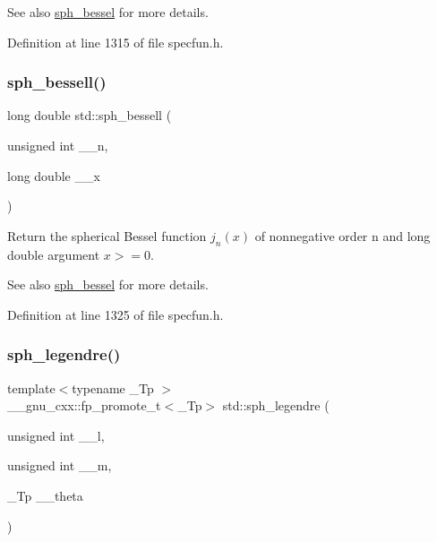\begin{DoxySeeAlso}{See also}
\hyperlink{group__cxx17__math__spec__func_gad125841d7c85e461cb8954952e3a17c8}{sph\+\_\+bessel} for more details. 
\end{DoxySeeAlso}


Definition at line 1315 of file specfun.\+h.

\mbox{\label{group__cxx17__math__spec__func_ga11d72b1af81ce9da3c878a25087ee927}} 
\subsubsection{\texorpdfstring{sph\+\_\+bessell()}{sph\_bessell()}}
{\footnotesize\ttfamily long double std\+::sph\+\_\+bessell (\begin{DoxyParamCaption}\item[{unsigned int}]{\+\_\+\+\_\+n,  }\item[{long double}]{\+\_\+\+\_\+x }\end{DoxyParamCaption})\hspace{0.3cm}{\ttfamily [inline]}}

Return the spherical Bessel function $ j_n(x) $ of nonnegative order n and {\ttfamily long double} argument $ x >= 0 $.

\begin{DoxySeeAlso}{See also}
\hyperlink{group__cxx17__math__spec__func_gad125841d7c85e461cb8954952e3a17c8}{sph\+\_\+bessel} for more details. 
\end{DoxySeeAlso}


Definition at line 1325 of file specfun.\+h.

\mbox{\label{group__cxx17__math__spec__func_gacef0d41a7ce572a9ace3437498794ed0}} 
\subsubsection{\texorpdfstring{sph\+\_\+legendre()}{sph\_legendre()}}
{\footnotesize\ttfamily template$<$typename \+\_\+\+Tp $>$ \\
\+\_\+\+\_\+gnu\+\_\+cxx\+::fp\+\_\+promote\+\_\+t$<$\+\_\+\+Tp$>$ std\+::sph\+\_\+legendre (\begin{DoxyParamCaption}\item[{unsigned int}]{\+\_\+\+\_\+l,  }\item[{unsigned int}]{\+\_\+\+\_\+m,  }\item[{\+\_\+\+Tp}]{\+\_\+\+\_\+theta }\end{DoxyParamCaption})\hspace{0.3cm}{\ttfamily [inline]}}

